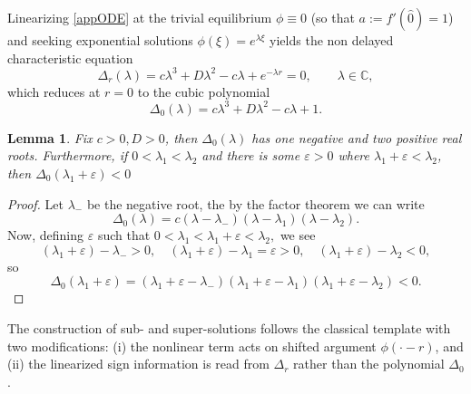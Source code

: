 \documentclass[12pt,letterpaper]{amsart}
\newtheorem{lemma}[theorem]{Lemma}
\theoremstyle{definition}
\theoremstyle{remark}
\newtheorem{remark}[theorem]{{\bf Remark}}
\numberwithin{equation}{section}
\begin{document}
 Linearizing \eqref{appODE} at the trivial equilibrium $\phi\equiv 0$ (so that
 $a:=f'(\hat0)=1$) and seeking exponential solutions $\phi(\xi)=e^{\lambda\xi}$ yields the  non delayed characteristic equation
 \begin{equation}\label{char_delay}
 	 \Delta_r(\lambda)=c\lambda^3 + D\lambda^2 - c\lambda + e^{-\lambda r}=0,
 	\qquad \lambda\in\mathbb C,
 \end{equation}
which reduces at $r=0$ to the cubic polynomial
 \[
 \Delta_0(\lambda)=c\lambda^3 + D\lambda^2 - c\lambda + 1.
 \]

\begin{lemma}\label{nondelay root}
 Fix $c>0, D>0$, then $\Delta_0(\lambda)$ has one negative and two positive real roots. Furthermore, if $0<\lambda_1 <\lambda_2$ and there is some $\varepsilon>0$ where $\lambda_1+\varepsilon <\lambda_2$, then $\Delta_0(\lambda_1+\varepsilon)<0$    
\end{lemma}

\begin{proof} Let $\lambda_{-}$ be the negative root, the by the factor theorem we can write
\[\Delta_0(\lambda)=c(\lambda-\lambda_{-})(\lambda-\lambda_1)(\lambda-\lambda_2).\]
   Now, defining $\varepsilon$ such that $0<\lambda_1<\lambda_1+\varepsilon<\lambda_2,$ we see
   \[(\lambda_1+\varepsilon)-\lambda_{-}>0, \quad (\lambda_1+\varepsilon)-\lambda_1=\varepsilon>0, \quad (\lambda_1+\varepsilon)-\lambda_2<0, \]
   so \[\Delta_0(\lambda_1+\varepsilon)=(\lambda_1+\varepsilon-\lambda_{-})(\lambda_1+\varepsilon-\lambda_{1})(\lambda_1+\varepsilon-\lambda_{2})<0.\]
\end{proof}
 
 The construction of sub- and super-solutions follows the classical template %
 with two modifications:
 (i) the nonlinear term acts on shifted argument $\phi(\cdot-r)$, and (ii) the linearized sign information is read from $\Delta_r$ rather than the polynomial $\Delta_0$.
 
 
\end{document}
